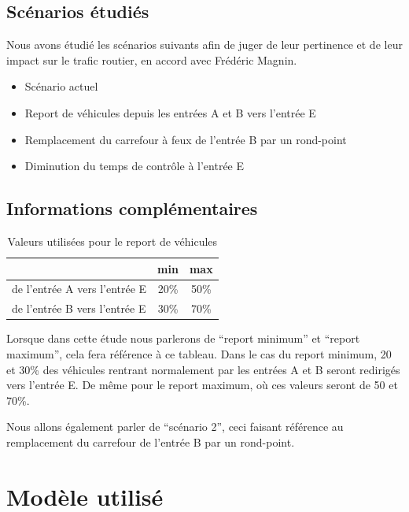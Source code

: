 \documentclass[a4paper,11pt, titlepage]{extarticle}
\begin{document}
\subsection{Scénarios étudiés}

Nous avons étudié les scénarios suivants afin de juger de leur pertinence et de leur impact sur le trafic routier, en accord avec Frédéric Magnin.

\begin{itemize}
\item Scénario actuel
\item Report de véhicules depuis les entrées A et B vers l'entrée E
\item Remplacement du carrefour à feux de l'entrée B par un rond-point
\item Diminution du temps de contrôle à l'entrée E
\end{itemize}

\subsection{Informations complémentaires}

\begin{table}[h!]
\begin{center}
\begin{tabular}{l|c|c}
 & min & max \\ \hline
de l'entrée A vers l'entrée E & 20\% & 50\% \\ \hline
de l'entrée B vers l'entrée E & 30\% & 70\% \\ 
\end{tabular}
\end{center}
\caption{Valeurs utilisées pour le report de véhicules}
\label{tabReport}
\end{table}

Lorsque dans cette étude nous parlerons de ``report minimum'' et ``report maximum'', cela fera référence à ce tableau. Dans le cas du report minimum, 20 et 30\% des véhicules rentrant normalement par les entrées A et B seront redirigés vers l'entrée E. De même pour le report maximum, où ces valeurs seront de 50 et 70\%.

\vspace{0.4cm}

Nous allons également parler de ``scénario 2'', ceci faisant référence au remplacement du carrefour de l'entrée B par un rond-point.

\newpage

\section{Modèle utilisé}
\end{document}
